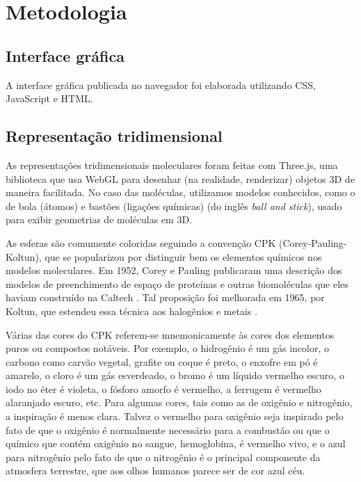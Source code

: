 \chapter{Metodologia
}\label{cap:desenvolvimento}
\section{Interface gráfica}

A interface gráfica publicada no navegador foi elaborada utilizando CSS, JavaScript e HTML. 

\section{Representação tridimensional}

As representações tridimensionais moleculares foram feitas com Three.js, uma biblioteca que usa WebGL para desenhar (na realidade, renderizar) objetos 3D de maneira facilitada. No caso das moléculas, utilizamos modelos conhecidos, como o de bola (átomos) e bastões (ligações químicas) (do inglês \textit{ball and stick}), usado para exibir geometrias de moléculas em 3D. 

As esferas são comumente coloridas seguindo a convenção CPK (Corey-Pauling-Koltun), que se popularizou por distinguir bem os elementos químicos nos modelos moleculares. Em 1952, Corey e Pauling publicaram uma descrição dos modelos de preenchimento de espaço de proteínas e outras biomoléculas que eles haviam construído na Caltech \autocite{Corey1953}. Tal proposição foi melhorada em 1965, por Koltun, que estendeu essa técnica aos halogênios e metais \autocite{Crossland2004-ll}.

Várias das cores do CPK referem-se mnemonicamente às cores dos elementos puros ou compostos notáveis. Por exemplo, o hidrogênio é um gás incolor, o carbono como carvão vegetal, grafite ou coque é preto, o enxofre em pó é amarelo, o cloro é um gás esverdeado, o bromo é um líquido vermelho escuro, o iodo no éter é violeta, o fósforo amorfo é vermelho, a ferrugem é vermelho alaranjado escuro, etc. Para algumas cores, tais como as de oxigênio e nitrogênio, a inspiração é menos clara. Talvez o vermelho para oxigênio seja inspirado pelo fato de que o oxigênio é normalmente necessário para a combustão ou que o químico que contém oxigênio no sangue, hemoglobina, é vermelho vivo, e o azul para nitrogênio pelo fato de que o nitrogênio é o principal componente da atmosfera terrestre, que aos olhos humanos parece ser de cor azul céu.

